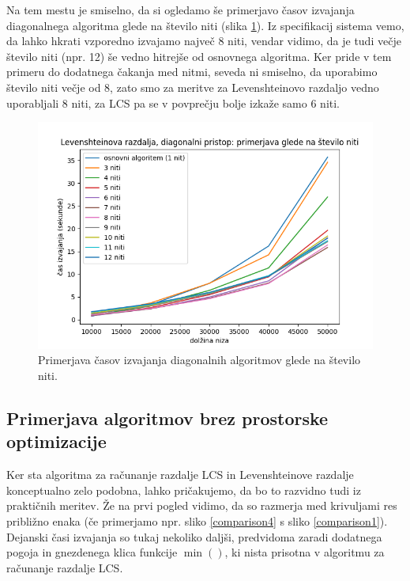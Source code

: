 \documentclass[a4paper,12pt,openright]{book}
\begin{document}
Na tem mestu je smiselno, da si ogledamo še primerjavo časov izvajanja diagonalnega algoritma glede na število niti (slika \ref{comparison5}). Iz specifikacij sistema vemo, da lahko hkrati vzporedno izvajamo največ 8 niti, vendar vidimo, da je tudi večje število niti (npr. 12) še vedno hitrejše od osnovnega algoritma. Ker pride v tem primeru do dodatnega čakanja med nitmi, seveda ni smiselno, da uporabimo število niti večje od 8, zato smo za meritve za Levenshteinovo razdaljo vedno uporabljali 8 niti, za LCS pa se v povprečju bolje izkaže samo 6 niti. 

\begin{figure}[htb]
\centering
\includegraphics[width=1.0\textwidth]{plots/nThreads.png}
\caption{Primerjava časov izvajanja diagonalnih algoritmov glede na število niti.}
\label{comparison5}
\end{figure}

\subsection{Primerjava algoritmov brez prostorske optimizacije}

Ker sta algoritma za računanje razdalje LCS in Levenshteinove razdalje konceptualno zelo podobna, lahko pričakujemo, da bo to razvidno tudi iz praktičnih meritev. Že na prvi pogled vidimo, da so razmerja med krivuljami res približno enaka (če primerjamo npr. sliko \ref{comparison4} s sliko \ref{comparison1}). Dejanski časi izvajanja so tukaj nekoliko daljši, predvidoma zaradi dodatnega pogoja in gnezdenega klica funkcije $\min()$, ki nista prisotna v algoritmu za računanje razdalje LCS. 
\end{document}
